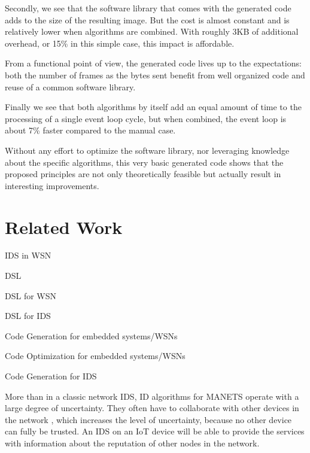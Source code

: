 \documentclass[conference]{IEEEtran}
\begin{document}
Secondly, we see that the software library that comes with the generated code
adds to the size of the resulting image. But the cost is almost constant and is
relatively lower when algorithms are combined. With roughly 3KB of additional
overhead, or 15\% in this simple case, this impact is affordable.

From a functional point of view, the generated code lives up to the
expectations: both the number of frames as the bytes sent benefit from well
organized code and reuse of a common software library.

Finally we see that both algorithms by itself add an equal amount of time to
the processing of a single event loop cycle, but when combined, the event loop
is about 7\% faster compared to the manual case.

Without any effort to optimize the software library, nor leveraging knowledge
about the specific algorithms, this very basic generated code shows that the
proposed principles are not only theoretically feasible but actually result in
interesting improvements.

\section{Related Work}
\label{related}

IDS in WSN \cite{perrig2004security,mishra2004intrusion}

DSL \cite{fowler2010domain,mernik2005and}

DSL for WSN \cite{naumowicz2009prototyping,levis2004tinyscript}

DSL for IDS \cite{eckmann2002statl}

Code Generation for embedded systems/WSNs \cite{leupers2000code,marwedel2002code}

Code Optimization for embedded systems/WSNs \cite{panda2001data,naik2001software}

Code Generation for IDS \cite{charitakis2003code}


More than in a classic network IDS, ID algorithms for MANETS operate with a
large degree of uncertainty. They often have to collaborate with other devices
in the network \cite{marchang2008collaborative,krontiris2009cooperative}, which
increases the level of uncertainty, because no other device can fully be
trusted. An IDS on an IoT device will be able to provide the services with
information about the reputation \cite{ganeriwal2008reputation} of other nodes
in the network.
\end{document}
